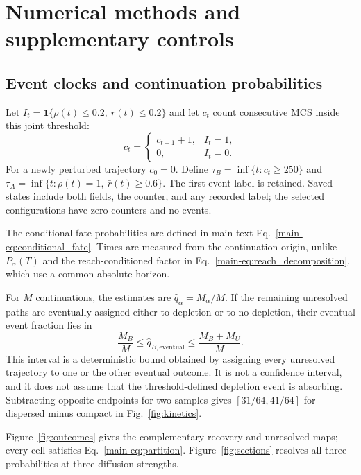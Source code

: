 \section{Numerical methods and supplementary controls}
\label{sec:checks}

\subsection{Event clocks and continuation probabilities}

Let $I_t=\mathbf 1\{\rho(t)\le0.2,\ \bar r(t)\le0.2\}$ and let $c_t$ count consecutive MCS inside this joint threshold:
\begin{equation}
\label{eq:clock}
c_t=
\begin{cases}
c_{t-1}+1,& I_t=1,\\
0,& I_t=0.
\end{cases}
\end{equation}
For a newly perturbed trajectory $c_0=0$. Define $\tau_B=\inf\{t:c_t\ge250\}$ and $\tau_A=\inf\{t:\rho(t)=1,\ \bar r(t)\ge0.6\}$. The first event label is retained. Saved states include both fields, the counter, and any recorded label; the selected configurations have zero counters and no events.

The conditional fate probabilities are defined in main-text Eq.~\eqref{main-eq:conditional_fate}. Times are measured from the continuation origin, unlike $P_\alpha(T)$ and the reach-conditioned factor in Eq.~\eqref{main-eq:reach_decomposition}, which use a common absolute horizon.

For $M$ continuations, the estimates are $\widehat q_\alpha=M_\alpha/M$. If the remaining unresolved paths are eventually assigned either to depletion or to no depletion, their eventual event fraction lies in
\begin{equation}
\label{eq:unresolved_bound}
\frac{M_B}{M}\le \widehat q_{B,\mathrm{eventual}}
\le\frac{M_B+M_U}{M}.
\end{equation}
This interval is a deterministic bound obtained by assigning every unresolved trajectory to one or the other eventual outcome. It is not a confidence interval, and it does not assume that the threshold-defined depletion event is absorbing. Subtracting opposite endpoints for two samples gives $[31/64,41/64]$ for dispersed minus compact in Fig.~\ref{fig:kinetics}.

Figure~\ref{fig:outcomes} gives the complementary recovery and unresolved maps; every cell satisfies Eq.~\eqref{main-eq:partition}. Figure~\ref{fig:sections} resolves all three probabilities at three diffusion strengths.

